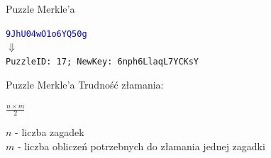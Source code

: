 \begin{frame}{Puzzle Merkle'a}
    \begin{center}
    \texttt{\textcolor{blue}{9JhU04wO1o6YQ50g}} \\
    \pause
    $\Downarrow$ \\
    \texttt{PuzzleID: 17; NewKey: 6nph6LlaqL7YCKsY}
    \end{center}
\end{frame}

\begin{frame}{Puzzle Merkle'a}
    Trudność złamania:
    \begin{center}
        {\Large \( \frac{n \times m}{2} \)} \\[10pt]
    \end{center}
    \( n \) - liczba zagadek \\
    \( m \) - liczba obliczeń potrzebnych do złamania jednej zagadki
\end{frame}